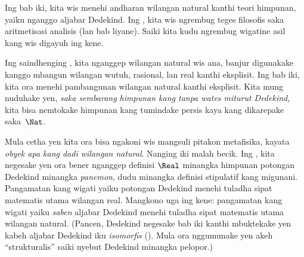 \documentclass[../../../include/open-logic-section]{subfiles}
\begin{document}


Ing bab iki, kita wis menehi andharan wilangan natural kanthi teori
himpunan, yaiku nganggo aljabar Dedekind. Ing
, kita wis ngrembug teges filosofis saka
aritmetisasi analisis (lan bab liyane). Saiki kita kudu ngrembug
wigatine asil kang wis digayuh ing kene.

Ing saindhenging , kita nganggep wilangan
natural wis ana, banjur digunakake kanggo mbangun wilangan wutuh,
rasional, lan real kanthi eksplisit. Ing bab iki, kita ora menehi
pambangunan wilangan natural kanthi eksplisit. Kita mung nuduhake yen,
\emph{saka sembarang himpunan kang tanpa wates miturut Dedekind}, kita
bisa nemtokake himpunan kang tumindake persis kaya kang dikarepake
saka~$\Nat$.

Mula cetha yen kita ora bisa ngakoni wis mangsuli pitakon metafisika,
kayata \emph{obyek apa kang dadi wilangan natural}. Nanging iki malah
becik. Ing , kita negesake yen ora bener
nganggep definisi $\Real$ minangka himpunan potongan Dedekind minangka
\emph{panemon}, dudu minangka definisi stipulatif kang migunani.
Pangamatan kang wigati
yaiku potongan Dedekind menehi tuladha sipat matematis utama wilangan
real. Mangkono uga ing kene: pangamatan kang wigati yaiku \emph{saben}
aljabar Dedekind menehi tuladha sipat matematis utama wilangan natural.
(Pancen, Dedekind negesake bab iki kanthi mbuktekake yen kabeh aljabar
Dedekind iku \emph{isomorfis} (\citeyear[Teorema
132--3]{Dedekind1888}). Mula ora nggumunake yen akeh ``strukturalis''
saiki nyebut Dedekind minangka pelopor.)
\end{document}
